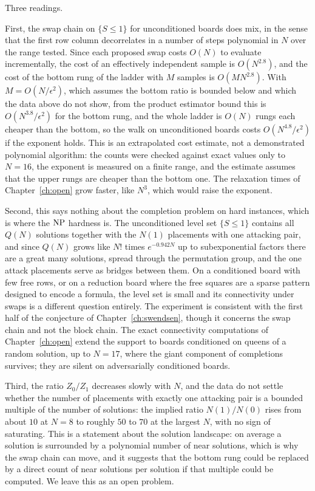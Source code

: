 Three readings.

First, the swap chain on $\{ S \le 1 \}$ for unconditioned boards does mix, in the sense that the first row column decorrelates in a number of steps polynomial in $N$ over the range tested. Since each proposed swap costs $O(N)$ to evaluate incrementally, the cost of an effectively independent sample is $O(N^{2.8})$, and the cost of the bottom rung of the ladder with $M$ samples is $O(M N^{2.8})$. With $M = O(N / \epsilon^2)$, which assumes the bottom ratio is bounded below and which the data above do not show, from the product estimator bound this is $O(N^{3.8} / \epsilon^2)$ for the bottom rung, and the whole ladder is $O(N)$ rungs each cheaper than the bottom, so the walk on unconditioned boards costs $O(N^{4.8} / \epsilon^2)$ if the exponent holds. This is an extrapolated cost estimate, not a demonstrated polynomial algorithm: the counts were checked against exact values only to $N = 16$, the exponent is measured on a finite range, and the estimate assumes that the upper rungs are cheaper than the bottom one. The relaxation times of Chapter~\ref{ch:open} grow faster, like $N^3$, which would raise the exponent.

Second, this says nothing about the completion problem on hard instances, which is where the $\mathrm{NP}$ hardness is. The unconditioned level set $\{ S \le 1 \}$ contains all $Q(N)$ solutions together with the $N(1)$ placements with one attacking pair, and since $Q(N)$ grows like $N!$ times $e^{-0.942 N}$ up to subexponential factors there are a great many solutions, spread through the permutation group, and the one attack placements serve as bridges between them. On a conditioned board with few free rows, or on a reduction board where the free squares are a sparse pattern designed to encode a formula, the level set is small and its connectivity under swaps is a different question entirely. The experiment is consistent with the first half of the conjecture of Chapter~\ref{ch:swendsen}, though it concerns the swap chain and not the block chain. The exact connectivity computations of Chapter~\ref{ch:open} extend the support to boards conditioned on queens of a random solution, up to $N = 17$, where the giant component of completions survives; they are silent on adversarially conditioned boards.

Third, the ratio $Z_0 / Z_1$ decreases slowly with $N$, and the data do not settle whether the number of placements with exactly one attacking pair is a bounded multiple of the number of solutions: the implied ratio $N(1)/N(0)$ rises from about $10$ at $N = 8$ to roughly $50$ to $70$ at the largest $N$, with no sign of saturating. This is a statement about the solution landscape: on average a solution is surrounded by a polynomial number of near solutions, which is why the swap chain can move, and it suggests that the bottom rung could be replaced by a direct count of near solutions per solution if that multiple could be computed. We leave this as an open problem.

